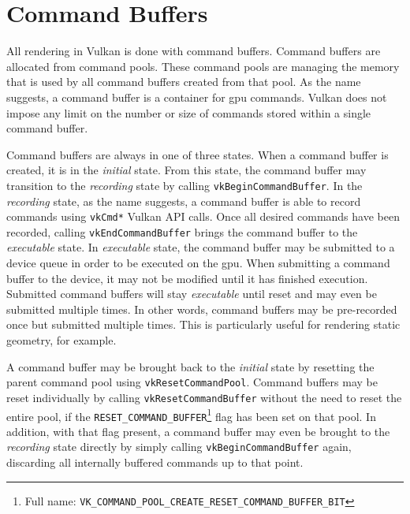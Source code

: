 
  \section{Command Buffers}
  \label{sec:CommandBuffers}
    All rendering in Vulkan is done with command buffers.
    Command buffers are allocated from command pools.
    These command pools are managing the memory that is used by all command buffers created from that pool.
    As the name suggests, a command buffer is a container for \gls{gpu} commands.
    Vulkan does not impose any limit on the number or size of commands stored within a single command buffer.

    Command buffers are always in one of three states.
    When a command buffer is created, it is in the \textit{initial} state.
    From this state, the command buffer may transition to the \textit{recording} state by calling \lstinline{vkBeginCommandBuffer}.
    In the \textit{recording} state, as the name suggests, a command buffer is able to record commands using \lstinline{vkCmd*} Vulkan API calls.
    Once all desired commands have been recorded, calling \lstinline{vkEndCommandBuffer} brings the command buffer to the \textit{executable} state.
    In \textit{executable} state, the command buffer may be submitted to a device queue in order to be executed on the \gls{gpu}.
    When submitting a command buffer to the device, it may not be modified until it has finished execution.
    Submitted command buffers will stay \textit{executable} until reset and may even be submitted multiple times.
    In other words, command buffers may be pre-recorded once but submitted multiple times.
    This is particularly useful for rendering static geometry, for example.

    A command buffer may be brought back to the \textit{initial} state by resetting the parent command pool using \lstinline{vkResetCommandPool}.
    Command buffers may be reset individually by calling \lstinline{vkResetCommandBuffer} without the need to reset the entire pool, if the \lstinline{RESET_COMMAND_BUFFER}\footnote{Full name: \lstinline{VK_COMMAND_POOL_CREATE_RESET_COMMAND_BUFFER_BIT}} flag has been set on that pool.
    In addition, with that flag present, a command buffer may even be brought to the \textit{recording} state directly by simply calling \lstinline{vkBeginCommandBuffer} again, discarding all internally buffered commands up to that point.

